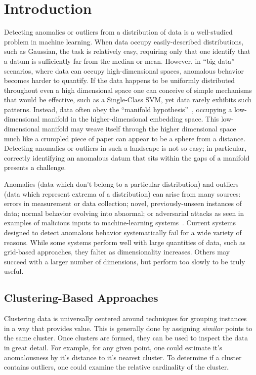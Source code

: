 \section{Introduction}
\label{sec:introduction}

Detecting anomalies or outliers from a distribution of data is a well-studied problem in machine learning.
When data occupy easily-described distributions, such as Gaussian, the task is relatively easy, requiring only that one identify that a datum is sufficiently far from the median or mean. 
However, in ``big data'' scenarios, where data can occupy high-dimensional spaces, anomalous behavior becomes harder to quantify.
If the data happens to be uniformly distributed throughout even a high dimensional space one can conceive of simple mechanisms that would be effective, such as a Single-Class SVM, yet data rarely exhibits such patterns.
Instead, data often obey the ``manifold hypothesis''~\cite{fefferman2016testing}, occupying a low-dimensional manifold in the higher-dimensional embedding space.
This low-dimensional manifold may weave itself through the higher dimensional space much like a crumpled piece of paper can appear to be a sphere from a distance.
Detecting anomalies or outliers in such a landscape is not so easy; in particular, correctly identifying an anomalous datum that sits within the gaps of a manifold presents a challenge.

Anomalies (data which don't belong to a particular distribution) and outliers (data which represent extrema of a distribution) can arise from many sources: errors in measurement or data collection; novel, previously-unseen instances of data; normal behavior evolving into abnormal; or adversarial attacks as seen in examples of malicious inputs to machine-learning systems~\cite{elsayed2018adversarial}.
Current systems designed to detect anomalous behavior systematically fail for a wide variety of reasons.
While some systems perform well with large quantities of data, such as grid-based approaches, they falter as dimensionality increases.
Others may succeed with a larger number of dimensions, but perform too slowly to be truly useful.

\subsection{Clustering-Based Approaches}

Clustering data is universally centered around techniques for grouping instances in a way that provides value.
This is generally done by assigning \textit{similar} points to the same cluster.
Once clusters are formed, they can be used to inspect the data in great detail.
For example, for any given point, one could estimate it's anomalousness by it's distance to it's nearest cluster.
To determine if a cluster contains outliers, one could examine the relative cardinality of the cluster.

